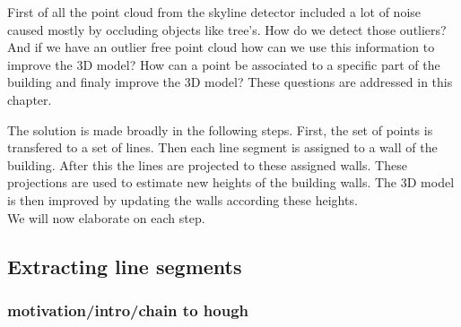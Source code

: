 \documentclass[10pt]{article}
\begin{document}
First of all the point cloud from the skyline detector included a lot of noise caused mostly
by occluding objects like tree's. How do we detect those outliers?
And if we have an outlier free point cloud how can we use this information to
improve the 3D model? How can a point be associated to a specific part of the
building and finaly improve the 3D model? 
These questions are addressed in this chapter.

The solution is made broadly in the following steps. First, the set of points is transfered to a set of
lines. Then each line segment is assigned to a wall of the building. After this 
the lines are projected to these assigned walls. 
These projections are used to estimate new heights of the building walls.
The 3D model is then improved by updating the walls according these heights. \\
 We will now elaborate on each step.





\subsection{Extracting line segments}
\subsubsection{motivation/intro/chain to hough} %

%
\end{document}
